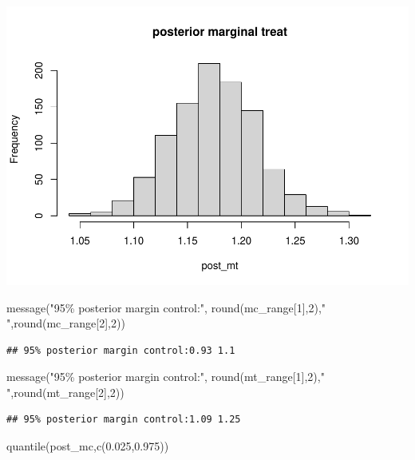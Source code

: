 \documentclass[
]{book}
\newenvironment{Shaded}{\begin{snugshade}}{\end{snugshade}}
\newcommand{\DecValTok}[1]{\textcolor[rgb]{0.00,0.00,0.81}{#1}}
\newcommand{\FloatTok}[1]{\textcolor[rgb]{0.00,0.00,0.81}{#1}}
\newcommand{\FunctionTok}[1]{\textcolor[rgb]{0.00,0.00,0.00}{#1}}
\newcommand{\NormalTok}[1]{#1}
\newcommand{\StringTok}[1]{\textcolor[rgb]{0.31,0.60,0.02}{#1}}
\theoremstyle{definition}
\theoremstyle{definition}
\theoremstyle{definition}
\theoremstyle{definition}
\theoremstyle{remark}
\begin{document}
\includegraphics{_main_files/figure-latex/unnamed-chunk-31-2.pdf}

\begin{Shaded}
\begin{Highlighting}[]
    \FunctionTok{message}\NormalTok{(}\StringTok{"95\% posterior margin control:"}\NormalTok{, }\FunctionTok{round}\NormalTok{(mc\_range[}\DecValTok{1}\NormalTok{],}\DecValTok{2}\NormalTok{),}\StringTok{" "}\NormalTok{,}\FunctionTok{round}\NormalTok{(mc\_range[}\DecValTok{2}\NormalTok{],}\DecValTok{2}\NormalTok{)) }
\end{Highlighting}
\end{Shaded}

\begin{verbatim}
## 95% posterior margin control:0.93 1.1
\end{verbatim}

\begin{Shaded}
\begin{Highlighting}[]
        \FunctionTok{message}\NormalTok{(}\StringTok{"95\% posterior margin control:"}\NormalTok{, }\FunctionTok{round}\NormalTok{(mt\_range[}\DecValTok{1}\NormalTok{],}\DecValTok{2}\NormalTok{),}\StringTok{" "}\NormalTok{,}\FunctionTok{round}\NormalTok{(mt\_range[}\DecValTok{2}\NormalTok{],}\DecValTok{2}\NormalTok{)) }
\end{Highlighting}
\end{Shaded}

\begin{verbatim}
## 95% posterior margin control:1.09 1.25
\end{verbatim}

\begin{Shaded}
\begin{Highlighting}[]
        \FunctionTok{quantile}\NormalTok{(post\_mc,}\FunctionTok{c}\NormalTok{(}\FloatTok{0.025}\NormalTok{,}\FloatTok{0.975}\NormalTok{))}
\end{Highlighting}
\end{Shaded}
\end{document}
